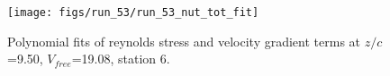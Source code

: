 \begin{figure}[H]
\centering
\texttt{[image: figs/run\_53/run\_53\_nut\_tot\_fit]}
\caption{Polynomial fits of reynolds stress and velocity gradient terms at $z/c$=9.50, $V_{free}$=19.08, station 6.}
\label{fig:run_53_nut_tot_fit}
\end{figure}


